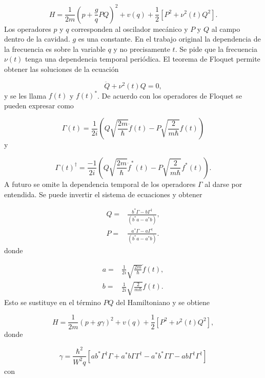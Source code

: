\documentclass[10pt,a4paper]{report}
\begin{document}
\begin{equation}
H = \frac{1}{2m}(p + \frac{g}{q} PQ)^2 + v(q) + \frac{1}{2}[P^2+\nu^2 (t)Q^2].
\end{equation} Los operadores $p$ y $q$ corresponden al oscilador mecánico y $P$ y $Q$ al campo dentro de la cavidad. $g$ es una constante. En el trabajo original la dependencia de la frecuencia es sobre la variable $q$ y no precisamente $t$. Se pide que la frecuencia $\nu(t)$ tenga una dependencia temporal periódica. El teorema de Floquet permite obtener las soluciones de la ecuación

\begin{equation}
\ddot{Q} + \nu^2(t)Q=0,
\end{equation} y se les llama $f(t)$ y $f(t)^*$. De acuerdo con \cite{HanngiFM} los operadores de Floquet se pueden expresar como

\begin{equation}
\Gamma(t) = \frac{1}{2i}(Q\sqrt{\frac{2m}{\hbar}}\dot{f}(t)-P\sqrt{\frac{2}{m\hbar}}f(t))
\end{equation} y

\begin{equation}
\Gamma(t)^\dagger = \frac{-1}{2i}(Q\sqrt{\frac{2m}{\hbar}}\dot{f}^*(t)-P\sqrt{\frac{2}{m\hbar}}f^*(t)).
\end{equation} A futuro se omite la dependencia temporal de los operadores $\Gamma$ al darse por entendida. Se puede invertir el sistema de ecuaciones y obtener

\begin{align}
Q =& \frac{b^* \Gamma - b \Gamma^\dagger}{(b^* a - a^*b)},\\
P =& \frac{a^* \Gamma - a \Gamma^\dagger}{(b^* a - a^*b)}.
\end{align} donde

\begin{align}
a =& \frac{1}{2i}\sqrt{\frac{2m}{\hbar}} \dot{f}(t),\\
b =& \frac{1}{2i}\sqrt{\frac{2}{m\hbar}} f(t).
\end{align} Esto se sustituye en el término $PQ$ del Hamiltoniano y se obtiene

\begin{equation}
H = \frac{1}{2m}(p + g \gamma)^2 + v(q) + \frac{1}{2}[P^2+\nu^2 (t)Q^2],
\end{equation} donde

\begin{equation}
\gamma = \frac{\hbar^2}{W^2 q}[ab^*\Gamma^\dagger \Gamma + a^*b \Gamma \Gamma^\dagger - a^*b^* \Gamma \Gamma - ab \Gamma^\dagger \Gamma^\dagger]
\end{equation} con
\end{document}
